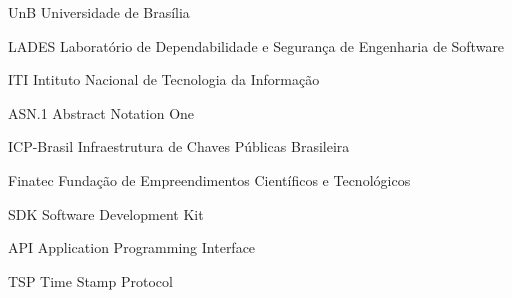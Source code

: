 \begin{siglas}
  \item [UnB] Universidade de Brasília
  \item [LADES] Laboratório de Dependabilidade e Segurança de Engenharia de Software
  \item [ITI] Intituto Nacional de Tecnologia da Informação
  \item [ASN.1] Abstract Notation One
  \item [ICP-Brasil] Infraestrutura de Chaves Públicas Brasileira
  \item [Finatec] Fundação de Empreendimentos Científicos e Tecnológicos
  \item [SDK] Software Development Kit
  \item [API] Application Programming Interface
  \item [TSP] Time Stamp Protocol
\end{siglas}

